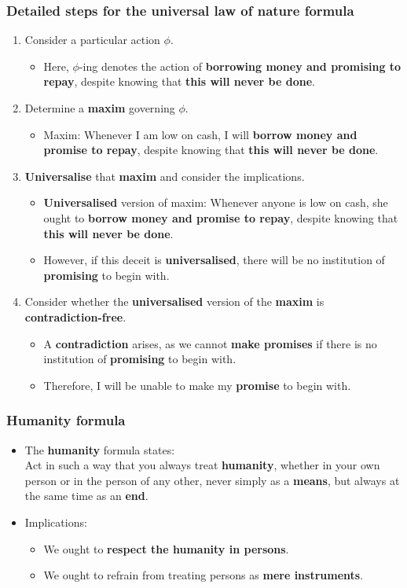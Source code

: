 \documentclass[11pt]{article}
\begin{document}
\subsubsection{Detailed steps for the universal law of nature formula}
\label{sec:org7db838f}
\begin{enumerate}
\item Consider a particular action \(\phi\).
\begin{itemize}
\item Here, \(\phi\)-ing denotes the action of \textbf{borrowing money and promising to repay}, despite knowing that \textbf{this will never be done}.
\end{itemize}
\item Determine a \textbf{maxim} governing \(\phi\).
\begin{itemize}
\item Maxim: Whenever I am low on cash, I will \textbf{borrow money and promise to repay}, despite knowing that \textbf{this will never be done}.
\end{itemize}
\item \textbf{Universalise} that \textbf{maxim} and consider the implications.
\begin{itemize}
\item \textbf{Universalised} version of maxim: Whenever anyone is low on cash, she ought to \textbf{borrow money and promise to repay}, despite knowing that \textbf{this will never be done}.
\item However, if this deceit is \textbf{universalised}, there will be no institution of \textbf{promising} to begin with.
\end{itemize}
\item Consider whether the \textbf{universalised} version of the \textbf{maxim} is \textbf{contradiction-free}.
\begin{itemize}
\item A \textbf{contradiction} arises, as we cannot \textbf{make promises} if there is no institution of \textbf{promising} to begin with.
\item Therefore, I will be unable to make my \textbf{promise} to begin with.
\end{itemize}
\end{enumerate}
\subsubsection{Humanity formula}
\label{sec:org10865fe}
\begin{itemize}
\item The \textbf{humanity} formula states:  \\
Act in such a way that you always treat \textbf{humanity}, whether in your own person or in the person of any other, never simply as a \textbf{means}, but always at the same time as an \textbf{end}.
\item Implications:
\begin{itemize}
\item We ought to \textbf{respect the humanity in persons}.
\item We ought to refrain from treating persons as \textbf{mere instruments}.
\end{itemize}
\end{itemize}
\end{document}
